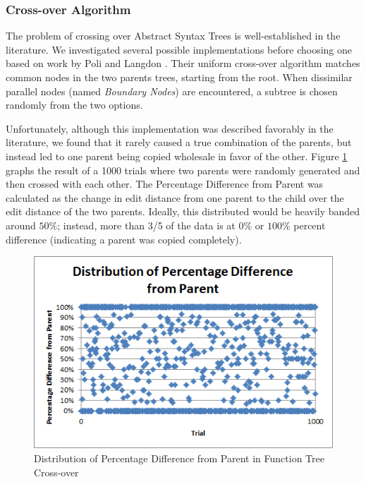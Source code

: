 \documentclass{acm_proc_article-sp}
\begin{document}
    \subsubsection{Cross-over Algorithm}
    
The problem of crossing over Abstract Syntax Trees is well-established in the literature. We investigated several possible implementations before choosing one based on work by Poli and Langdon \cite{crossover}. Their uniform cross-over algorithm matches common nodes in the two parents trees, starting from the root. When dissimilar parallel nodes (named \textit{Boundary Nodes}) are encountered, a subtree is chosen randomly from the two options. 

Unfortunately, although this implementation was described favorably in the literature, we found that it rarely caused a true combination of the parents, but instead led to one parent being copied wholesale in favor of the other. Figure \ref{cross-over similarity} graphs the result of a 1000 trials where two parents were randomly generated and then crossed with each other. The Percentage Difference from Parent was calculated as the change in edit distance from one parent to the child over the edit distance of the two parents. Ideally, this distributed would be heavily banded around $50\%$; instead, more than 3/5 of the data is at $0\%$ or $100\%$ percent difference (indicating a parent was copied completely).

    \begin{figure}[h]
        \centering
        \includegraphics[width=\columnwidth]{./images/dist-perc-diff.png}
        \caption{Distribution of Percentage Difference from Parent in Function Tree Cross-over}
        \label{cross-over similarity}
    \end{figure}
    
\end{document}
